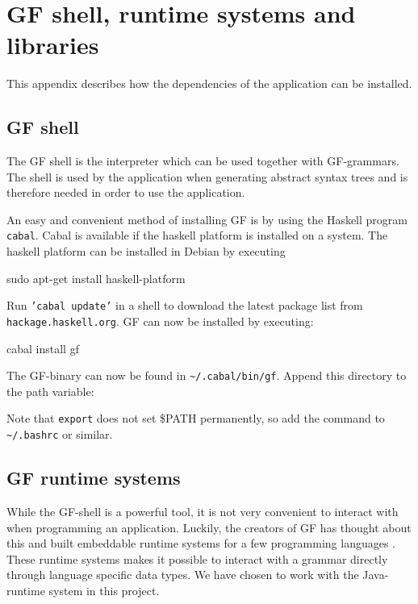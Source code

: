 \chapter{GF shell, runtime systems and libraries}\label{ch:appendix-a}
This appendix describes how the dependencies of the application can be installed.

\section{GF shell}
The GF shell is the interpreter which can be used together with GF-grammars. The shell is used by the application when generating abstract syntax trees and is therefore needed in order to use the application.

An easy and convenient method of installing GF is by using the Haskell program \texttt{cabal}. Cabal is available if the haskell platform is installed on a system. The haskell platform can be installed in Debian by executing

\begin{terminal}
sudo apt-get install haskell-platform
\end{terminal}
Run \texttt{'cabal update'} in a shell to download the latest package list from \texttt{hackage.haskell.org}. GF can now be installed by executing:

\begin{terminal}
cabal install gf
\end{terminal}

The GF-binary can now be found in \texttt{\textasciitilde /.cabal/bin/gf}. Append this directory to the path variable:


Note that \texttt{export} does not set \$PATH permanently, so add the command to \texttt{\textasciitilde /.bashrc} or similar. 

\section{GF runtime systems}

While the GF-shell is a powerful tool, it is not very convenient to interact with when programming an application. Luckily, the creators of GF has thought about this and built embeddable runtime systems for a few programming languages \cite[p. 3]{angelov:2011}. These runtime systems makes it possible to interact with a grammar directly through language specific data types. We have chosen to work with the Java-runtime system in this project.


